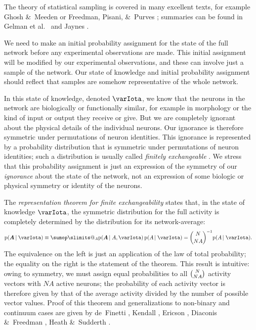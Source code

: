 \documentclass[\ifafour a4paper,12pt,\else a5paper,10pt,\fi%
onecolumn,oneside,article,%
british%
]{memoir}
\makeatletter
\theoremstyle{remark}
\theoremstyle{innote}
\def\sum{\DOTSI\sumop\slimits@}
\newcommand*{\citep}{\parencites}
\newcommand*{\citey}{\parencites*}
\newcommand*{\amp}{\&}
\newcommand*{\pf}{\mathrm{p}}%
\renewcommand*{\|}{\nonscript\,\vert\nonscript\;\mathopen{}}
\newcommand*{\chap}{ch.}%
\newcommand*{\etal}{{et al.}}
\newcommand*{\yAv}{A}
\newcommand*{\yNv}{N}
\newcommand*{\yAA}{\bm{\yAv}}%
\newcommand*{\yA}{\yAv}%
\newcommand*{\yH}{\varIota}
\makeatother
\begin{document}
\bigskip

The theory of statistical sampling is covered in many excellent texts, for
example Ghosh \amp\ Meeden \citey{ghoshetal1997} or Freedman, Pisani, \amp\
Purves \citey[parts~I, VI]{freedmanetal1978_r2007}; summaries can be found
in Gelman \etal\ \citey[\chap~8]{gelmanetal1995_r2014} and Jaynes
\citey[\chap~3]{jaynes1994_r2003}.

We need to make an initial probability assignment for the state of the full
network before any experimental observations are made. This initial
assignment will be modified by our experimental observations, and these can
involve just a sample of the network. Our state of knowledge and initial
probability assignment should reflect that samples are somehow
representative of the whole network.

In this state of knowledge, denoted $\yH$, we know that the neurons in the
network are biologically or functionally similar, for example in
morphology or the kind of input or output they receive or give. But we are
completely ignorant about the physical details of the individual neurons.
Our ignorance is therefore symmetric under permutations of neuron
identities. This ignorance is represented by a probability distribution
that is symmetric under permutations of neuron identities; such a
distribution is usually called \emph{finitely exchangeable}
\citep{ericson1969}[\chap~1]{ghoshetal1997}. We stress that this
probability assignment is just an expression of the symmetry of our
\emph{ignorance} about the state of the network, not an expression of
some biologic or physical symmetry or identity of the neurons.

The \emph{representation theorem for finite exchangeability} states that,
in the state of knowledge $\yH$, the symmetric distribution for the full
activity is completely determined by the distribution for its
network-average:
\begin{equation}
  \label{eq:joint_plaus_N_homog}
  \pf(\yAA \|  \yH) \equiv
  \sum_{\yA}\pf(\yAA \| \yA, \yH)\,
  \pf(\yA \| \yH) =
  \binom{\yNv}{\yNv\yA}^{-1} \pf(\yA \| \yH).
\end{equation}
The equivalence on the left is just an application of the law of total
probability; the equality on the right is the statement of the theorem.
This result is intuitive: owing to symmetry, we must assign equal
probabilities to all $\tbinom{\yNv}{\yNv\yA}$ activity vectors with
$\yNv\yA$ active neurons; the probability of each activity vector is
therefore given by that of the average activity divided by the number of
possible vector values. Proof of this theorem and generalizations to
non-binary and continuum cases are given by de~Finetti
\citey{definetti1959b}, Kendall \citey{kendall1967}, Ericson
\citey{ericson1976}, Diaconis \amp\ Freedman
\citey{diaconis1977,diaconisetal1980}, Heath \amp\ Sudderth
\citey{heathetal1976}.
\end{document}
